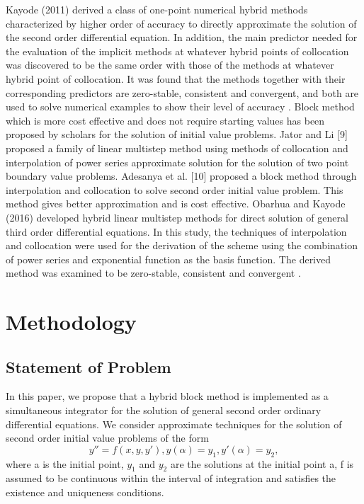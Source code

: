 \documentclass[12pt]{report}
\begin{document}
\noindent Kayode (2011) derived a class of one-point numerical hybrid methods characterized by higher order of accuracy to directly approximate the solution of the second order differential equation. In addition, the main predictor needed for the evaluation of the implicit methods at whatever hybrid points of collocation was discovered to be the same order with those of the methods at whatever hybrid point of collocation. It was found that the methods together with their corresponding predictors are zero-stable, consistent and convergent, and both are used to solve numerical examples to show their level of accuracy \cite{kayode}.
\noindent Block method which is more cost effective and does not require starting values has been proposed by scholars for the solution of initial value problems. Jator and Li [9] proposed a family of linear multistep method using methods of collocation and interpolation of power series approximate solution for the solution of two point boundary value problems. Adesanya et al. [10] proposed a block method through interpolation and collocation to solve second order initial value problem. This method gives better approximation and is cost effective.
\noindent Obarhua and Kayode (2016) developed hybrid linear multistep methods for direct solution of general third order differential equations. In this study, the techniques of interpolation and collocation were used for the derivation of the scheme using the combination of power series and exponential function as the basis function. The derived method was examined to be zero-stable, consistent and convergent \cite{obarhua}.


\chapter{Methodology}
\section{Statement of Problem}
In this paper, we propose that a hybrid block method is implemented as a simultaneous integrator for the solution of general second order ordinary differential equations. We consider approximate techniques for the solution of second order initial value problems of the form
	\begin{equation}
		y'' = f (x, y, y'), y(\alpha) = y_1 , y'(\alpha) = y_2 ,						 		
	\end{equation}
	where a is the initial point, $y_1$ and $y_2$ are the solutions at the initial point a, f is assumed to be continuous within the interval of integration and satisfies the existence and uniqueness conditions.
\end{document}
